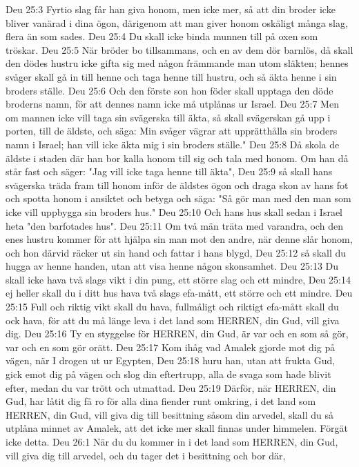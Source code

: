 Deu 25:3  Fyrtio slag får han giva honom, men icke mer, så att din broder icke bliver vanärad i dina ögon, därigenom att man giver honom oskäligt många slag, flera än som sades.
Deu 25:4  Du skall icke binda munnen till på oxen som tröskar.
Deu 25:5  När bröder bo tillsammans, och en av dem dör barnlös, då skall den dödes hustru icke gifta sig med någon främmande man utom släkten; hennes svåger skall gå in till henne och taga henne till hustru, och så äkta henne i sin broders ställe.
Deu 25:6  Och den förste son hon föder skall upptaga den döde broderns namn, för att dennes namn icke må utplånas ur Israel.
Deu 25:7  Men om mannen icke vill taga sin svägerska till äkta, så skall svägerskan gå upp i porten, till de äldste, och säga: Min svåger vägrar att upprätthålla sin broders namn i Israel; han vill icke äkta mig i sin broders ställe."
Deu 25:8  Då skola de äldste i staden där han bor kalla honom till sig och tala med honom. Om han då står fast och säger: "Jag vill icke taga henne till äkta",
Deu 25:9  så skall hans svägerska träda fram till honom inför de äldstes ögon och draga skon av hans fot och spotta honom i ansiktet och betyga och säga: "Så gör man med den man som icke vill uppbygga sin broders hus."
Deu 25:10  Och hans hus skall sedan i Israel heta "den barfotades hus".
Deu 25:11  Om två män träta med varandra, och den enes hustru kommer för att hjälpa sin man mot den andre, när denne slår honom, och hon därvid räcker ut sin hand och fattar i hans blygd,
Deu 25:12  så skall du hugga av henne handen, utan att visa henne någon skonsamhet.
Deu 25:13  Du skall icke hava två slags vikt i din pung, ett större slag och ett mindre,
Deu 25:14  ej heller skall du i ditt hus hava två slags efa-mått, ett större och ett mindre.
Deu 25:15  Full och riktig vikt skall du hava, fullmåligt och riktigt efa-mått skall du ock hava, för att du må länge leva i det land som HERREN, din Gud, vill giva dig.
Deu 25:16  Ty en styggelse för HERREN, din Gud, är var och en som så gör, var och en som gör orätt.
Deu 25:17  Kom ihåg vad Amalek gjorde mot dig på vägen, när I drogen ut ur Egypten,
Deu 25:18  huru han, utan att frukta Gud, gick emot dig på vägen och slog din eftertrupp, alla de svaga som hade blivit efter, medan du var trött och utmattad.
Deu 25:19  Därför, när HERREN, din Gud, har låtit dig få ro för alla dina fiender runt omkring, i det land som HERREN, din Gud, vill giva dig till besittning såsom din arvedel, skall du så utplåna minnet av Amalek, att det icke mer skall finnas under himmelen. Förgät icke detta.
Deu 26:1  När du du kommer in i det land som HERREN, din Gud, vill giva dig till arvedel, och du tager det i besittning och bor där,
